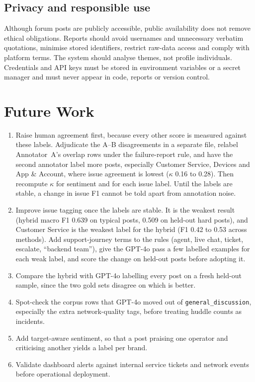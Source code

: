 \documentclass[11pt,a4paper]{article}
\begin{document}
\subsection{Privacy and responsible use}

Although forum posts are publicly accessible, public availability does not remove ethical obligations. Reports should avoid usernames and unnecessary verbatim quotations, minimise stored identifiers, restrict raw-data access and comply with platform terms. The system should analyse themes, not profile individuals. Credentials and API keys must be stored in environment variables or a secret manager and must never appear in code, reports or version control.

\section{Future Work}
\label{sec:future}

\begin{enumerate}
  \item Raise human agreement first, because every other score is measured against these labels. Adjudicate the A--B disagreements in a separate file, relabel Annotator~A's overlap rows under the failure-report rule, and have the second annotator label more posts, especially Customer Service, Devices and App \& Account, where issue agreement is lowest ($\kappa$ 0.16 to 0.28). Then recompute $\kappa$ for sentiment and for each issue label. Until the labels are stable, a change in issue F1 cannot be told apart from annotation noise.
  \item Improve issue tagging once the labels are stable. It is the weakest result (hybrid macro F1 0.639 on typical posts, 0.509 on held-out hard posts), and Customer Service is the weakest label for the hybrid (F1 0.42 to 0.53 across methods). Add support-journey terms to the rules (agent, live chat, ticket, escalate, ``backend team''), give the GPT-4o pass a few labelled examples for each weak label, and score the change on held-out posts before adopting it.
  \item Compare the hybrid with GPT-4o labelling every post on a fresh held-out sample, since the two gold sets disagree on which is better.
  \item Spot-check the corpus rows that GPT-4o moved out of \texttt{general\_discussion}, especially the extra network-quality tags, before treating huddle counts as incidents.
  \item Add target-aware sentiment, so that a post praising one operator and criticising another yields a label per brand.
  \item Validate dashboard alerts against internal service tickets and network events before operational deployment.
\end{enumerate}
\end{document}
